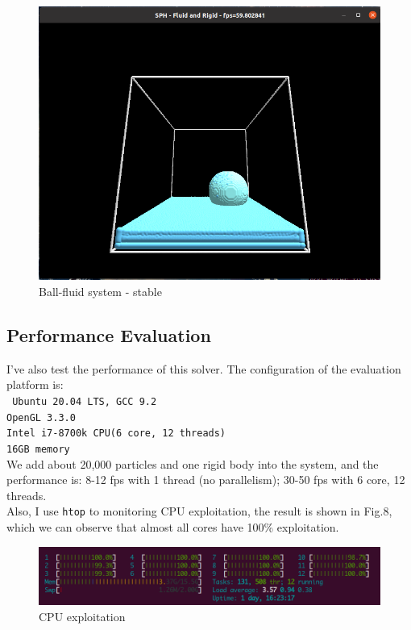 \documentclass[acmtog]{acmart}
\begin{document}
\begin{figure}[H]
    \centering
    \includegraphics[scale=0.2]{../5.png}
    \caption{Ball-fluid system - stable}
\end{figure}

\subsection{Performance Evaluation}
I've also test the performance of this solver. The configuration of the evaluation platform is:\\
\texttt{
Ubuntu 20.04 LTS, GCC 9.2\\
OpenGL 3.3.0\\
Intel i7-8700k CPU(6 core, 12 threads)\\
16GB memory\\
}
We add about 20,000 particles and one rigid body into the system, and the performance is:
8-12 fps with 1 thread (no parallelism); 30-50 fps with 6 core, 12 threads.\\
Also, I use \texttt{htop} to monitoring CPU exploitation, the result is shown in Fig.8, 
which we can observe that almost all cores have 100\% exploitation.
\begin{figure}[H]
    \centering
    \includegraphics[scale=0.2]{../7.png}
    \caption{CPU exploitation}
\end{figure}
\end{document}
